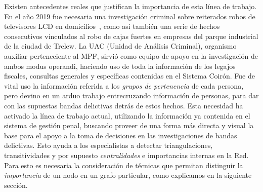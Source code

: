 Existen antecedentes reales que justifican la importancia de esta línea de trabajo. 
En el año 2019 fue necesaria una investigación criminal sobre reiterados robos de televisores LCD en domicilios~\cite{noticiaLCDdiario}, como así también una serie de hechos consecutivos vinculados al robo de cajas fuertes en empresas del parque industrial de la ciudad de Trelew.
La UAC (Unidad de Análisis Criminal), organismo auxiliar perteneciente al MPF, sirvió como equipo de apoyo en la investigación de ambos modus operandi, haciendo uso de toda la información de los legajos fiscales, consultas generales y específicas contenidas en el Sistema Coirón. Fue de vital uso la información referida a los \textit{grupos de pertenencia} de cada persona, pero devino en un arduo trabajo entrecruzando información de personas, para dar con las supuestas bandas delictivas detrás de estos hechos.
Esta necesidad ha activado la línea de trabajo actual, utilizando la información ya contenida en el sistema de gestión penal, buscando proveer de una forma más directa y visual la base para el apoyo a la toma de decisiones en las investigaciones de bandas delictivas. 
Esto ayuda a los especialistas a detectar triangulaciones, transitividades y por supuesto \textit{centralidades} e importancias internas en la Red. 
Para esto es necesaria la consideración de técnicas que permitan distinguir la \textit{importancia} de un nodo en un grafo particular, como explicamos en la siguiente sección.